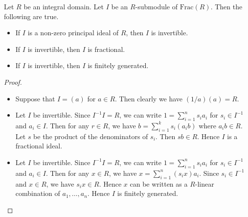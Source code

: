 \documentclass[a4paper]{article}
\begin{document}
\begin{prp}{}{} Let $R$ be an integral domain. Let $I$ be an $R$-submodule of $\text{Frac}(R)$. Then the following are true. 
\begin{itemize}
\item If $I$ is a non-zero principal ideal of $R$, then $I$ is invertible. 
\item If $I$ is invertible, then $I$ is fractional. 
\item If $I$ is invertible, then $I$ is finitely generated. 
\end{itemize} \tcbline
\begin{proof}~\\
\begin{itemize}
\item Suppose that $I=(a)$ for $a\in R$. Then clearly we have $(1/a)(a)=R$. 
\item Let $I$ be invertible. Since $I^{-1}I=R$, we can write $1=\sum_{i=1}^ns_ia_i$ for $s_i\in I^{-1}$ and $a_i\in I$. Then for any $r\in R$, we have $b=\sum_{i=1}^ks_i(a_ib)$ where $a_ib\in R$. Let $s$ be the product of the denominators of $s_i$. Then $sb\in R$. Hence $I$ is a fractional ideal. 
\item Let $I$ be invertible. Since $I^{-1}I=R$, we can write $1=\sum_{i=1}^ns_ia_i$ for $s_i\in I^{-1}$ and $a_i\in I$. Then for any $x\in R$, we have $x=\sum_{i=1}^n(s_ix)a_i$. Since $s_i\in I^{-1}$ and $x\in R$, we have $s_ix\in R$. Hence $x$ can be written as a $R$-linear combination of $a_1,\dots,a_n$. Hence $I$ is finitely generated. 
\end{itemize}
\end{proof}
\end{prp}
\end{document}
